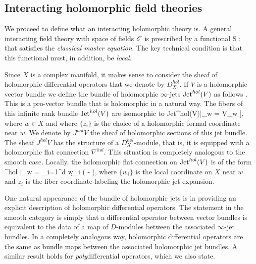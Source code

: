 \documentclass[10pt]{amsart}
\begin{document}
\subsection{Interacting holomorphic field theories} \label{sec: interacting}

\def\olochol{\sO_{\rm loc}^{hol}}

We proceed to define what an interacting holomorphic theory is.
A general interacting field theory with space of fields $\mathscr E$ is prescribed by a functional
\ben
S : \sE \to \CC
\een
that satisfies the {\em classical master equation}.
The key technical condition is that this functional must, in addition, be {\em local}.




Since $X$ is a complex manifold, it makes sense to consider the sheaf of holomorphic differential operators that we denote by $D_X^{hol}$. 
If $V$ is a holomorphic vector bundle we define the bundle of holomorphic $\infty$-jets ${\rm Jet}^{hol}(V)$ as follows \cite{GriffithsGreen, WongChandler}. 
This is a pro-vector bundle that is holomorphic in a natural way.
The fibers of this infinite rank bundle ${\rm Jet}^{hol}(V)$ are isomorphic to 
\ben
{\rm Jet}^{hol}(V)|_w = V_w \tensor \CC[[z_1,\ldots,z_d]],
\een
where $w \in X$ and where $\{z_i\}$ is the choice of a holomorphic formal coordinate near $w$. 
We denote by $J^{hol} V$ the sheaf of holomorphic sections of this jet bundle.
The sheaf $J^{hol}V$ has the structure of a $D_X^{hol}$-module, that is, it is equipped with a holomorphic flat connection $\nabla^{hol}$.
This situation is completely analogous to the smooth case.
Locally, the holomorphic flat connection on ${\rm Jet}^{hol}(V)$ is of the form
\ben
\nabla^{hol} |_w = \sum_{i=1}^d \d w_i \left( - \right),
\een
where $\{w_i\}$ is the local coordinate on $X$ near $w$ and $z_i$ is the fiber coordinate labeling the holomorphic jet expansion.

One natural appearance of the bundle of holomorphic jets is in providing an explicit description of holomorphic differential operators. 
The statement in the smooth category is simply that a differential operator between vector bundles is equivalent to the data of a map of $D$-modules between the associated $\infty$-jet bundles.
In a completely analogous way, holomorphic differential operators are the same as bundle maps between the associated holomorphic jet bundles. 
A similar result holds for {\em poly}differential operators, which we also state.
\end{document}
